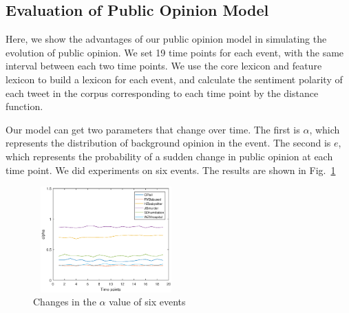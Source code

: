 \documentclass[runningheads]{llncs}
\begin{document}
\subsection{Evaluation of Public Opinion Model}
Here, we show the advantages of our public opinion model in simulating the evolution of public opinion. We set 19 time points for each event, with the same interval between each two time points. We use the core lexicon and feature lexicon to build a lexicon for each event, and calculate the sentiment polarity of each tweet in the corpus corresponding to each time point by the distance function.

Our model can get two parameters that change over time. The first is $\alpha$, which represents the distribution of background opinion in the event. The second is $e$, which represents the probability of a sudden change in public opinion at each time point. We did experiments on six events. The results are shown in Fig.~\ref{fig:alpha}

\vspace{-0.5cm}
\begin{figure}
    \centering
    \includegraphics[width=0.5\textwidth,height=1.6in]{alpha.eps}
    \setlength{\abovecaptionskip}{-0.1cm}
    \caption{Changes in the $\alpha$ value of six events}\label{fig:alpha}
\end{figure}
\end{document}
